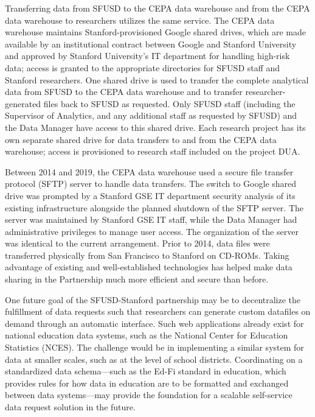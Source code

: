Transferring data from SFUSD to the CEPA data warehouse and from the CEPA data warehouse to researchers utilizes the same service. The CEPA data warehouse maintains Stanford-provisioned Google shared drives, which are made available by an institutional contract between Google and Stanford University and approved by Stanford University's IT department for handling high-risk data; access is granted to the appropriate directories for SFUSD staff and Stanford researchers. One shared drive is used to transfer the complete analytical data from SFUSD to the CEPA data warehouse and to transfer researcher-generated files back to SFUSD as requested. Only SFUSD staff (including the Supervisor of Analytics, and any additional staff as requested by SFUSD) and the Data Manager have access to this shared drive. Each research project has its own separate shared drive for data transfers to and from the CEPA data warehouse; access is provisioned to research staff included on the project DUA.

Between 2014 and 2019, the CEPA data warehouse used a secure file transfer protocol (SFTP) server to handle data transfers. The switch to Google shared drive was prompted by a Stanford GSE IT department security analysis of its existing infrastructure alongside the planned shutdown of the SFTP server. The server was maintained by Stanford GSE IT staff, while the Data Manager had administrative privileges to manage user access. The organization of the server was identical to the current arrangement. Prior to 2014, data files were transferred physically from San Francisco to Stanford on CD-ROMs. Taking advantage of existing and well-established technologies has helped make data sharing in the Partnership much more efficient and secure than before.

One future goal of the SFUSD-Stanford partnership may be to decentralize the fulfillment of data requests such that researchers can generate custom datafiles on demand through an automatic interface. Such web applications already exist for national education data systems, such as the National Center for Education Statistics (NCES). The challenge would be in implementing a similar system for data at smaller scales, such as at the level of school districts. Coordinating on a standardized data schema---such as the Ed-Fi standard in education, which provides rules for how data in education are to be formatted and exchanged between data systems---may provide the foundation for a scalable self-service data request solution in the future.

